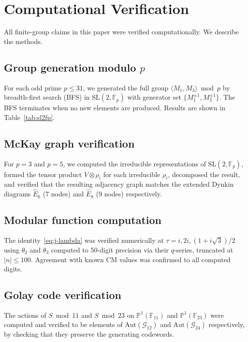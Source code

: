 \documentclass[12pt]{amsart}
\theoremstyle{definition}
\theoremstyle{remark}
\newcommand{\SL}{\mathrm{SL}}
\newcommand{\Aut}{\mathrm{Aut}}
\newcommand{\Fp}{\mathbb{F}_p}
\newcommand{\PP}{\mathbb{P}}
\begin{document}
\section{Computational Verification}\label{sec:computation}

All finite-group claims in this paper were verified computationally.
We describe the methods.

\subsection{Group generation modulo $p$}

For each odd prime $p \le 31$, we generated the full group
$\langle M_1, M_3 \rangle \bmod p$ by breadth-first search (BFS) in
$\SL(2,\Fp)$ with generator set $\{M_1^{\pm1}, M_3^{\pm1}\}$.
The BFS terminates when no new elements are produced.  Results are
shown in Table~\ref{tab:sl2fp}.

\subsection{McKay graph verification}

For $p = 3$ and $p = 5$, we computed the irreducible representations
of $\SL(2,\Fp)$, formed the tensor product $V \otimes \rho_i$ for
each irreducible $\rho_i$, decomposed the result, and verified that
the resulting adjacency graph matches the extended Dynkin diagrams
$\hat{E}_6$ (7 nodes) and $\hat{E}_8$ (9 nodes) respectively.

\subsection{Modular function computation}

The identity~\eqref{eq:j-lambda} was verified numerically at
$\tau = i, 2i, (1+i\sqrt{3})/2$ using $\theta_2$ and $\theta_3$
computed to 50-digit precision via their $q$-series, truncated at
$|n| \le 100$.  Agreement with known CM values was confirmed to
all computed digits.

\subsection{Golay code verification}

The actions of $S \bmod 11$ and $S \bmod 23$ on
$\PP^1(\mathbb{F}_{11})$ and $\PP^1(\mathbb{F}_{23})$ were computed
and verified to be elements of $\Aut(\mathcal{G}_{12})$ and
$\Aut(\mathcal{G}_{24})$ respectively, by checking that they preserve
the generating codewords.
\end{document}
